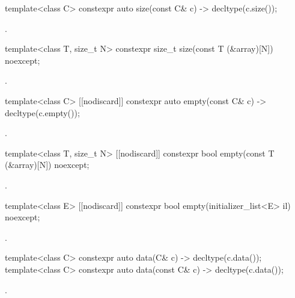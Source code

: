 %
\begin{itemdecl}
template<class C> constexpr auto size(const C& c) -> decltype(c.size());
\end{itemdecl}
\begin{itemdescr}
\pnum \returns {}.
\end{itemdescr}

%
\begin{itemdecl}
template<class T, size_t N> constexpr size_t size(const T (&array)[N]) noexcept;
\end{itemdecl}
\begin{itemdescr}
\pnum \returns {}.
\end{itemdescr}

%
\begin{itemdecl}
template<class C> [[nodiscard]] constexpr auto empty(const C& c) -> decltype(c.empty());
\end{itemdecl}
\begin{itemdescr}
\pnum \returns {}.
\end{itemdescr}

%
\begin{itemdecl}
template<class T, size_t N> [[nodiscard]] constexpr bool empty(const T (&array)[N]) noexcept;
\end{itemdecl}
\begin{itemdescr}
\pnum \returns {}.
\end{itemdescr}

%
\begin{itemdecl}
template<class E> [[nodiscard]] constexpr bool empty(initializer_list<E> il) noexcept;
\end{itemdecl}
\begin{itemdescr}
\pnum \returns {}.
\end{itemdescr}

%
\begin{itemdecl}
template<class C> constexpr auto data(C& c) -> decltype(c.data());
template<class C> constexpr auto data(const C& c) -> decltype(c.data());
\end{itemdecl}
\begin{itemdescr}
\pnum \returns {}.
\end{itemdescr}

